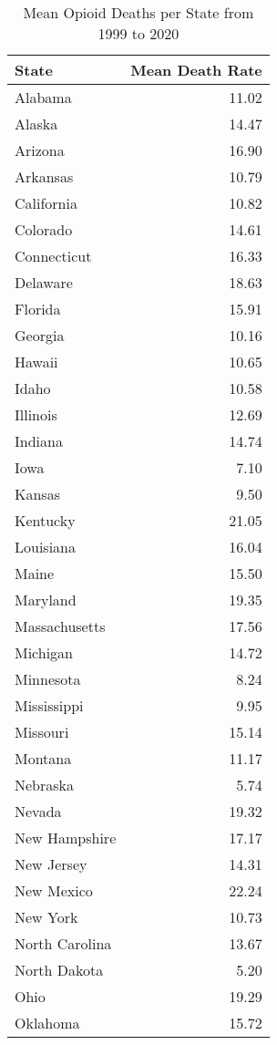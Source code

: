 \begin{table}\centering
\caption{Mean Opioid Deaths per State from 1999 to 2020}
\label{}
\begin{tabular}[t]{l|r}
\hline
State & Mean Death Rate\\
\hline
Alabama & 11.02\\
\hline
Alaska & 14.47\\
\hline
Arizona & 16.90\\
\hline
Arkansas & 10.79\\
\hline
California & 10.82\\
\hline
Colorado & 14.61\\
\hline
Connecticut & 16.33\\
\hline
Delaware & 18.63\\
\hline
Florida & 15.91\\
\hline
Georgia & 10.16\\
\hline
Hawaii & 10.65\\
\hline
Idaho & 10.58\\
\hline
Illinois & 12.69\\
\hline
Indiana & 14.74\\
\hline
Iowa & 7.10\\
\hline
Kansas & 9.50\\
\hline
Kentucky & 21.05\\
\hline
Louisiana & 16.04\\
\hline
Maine & 15.50\\
\hline
Maryland & 19.35\\
\hline
Massachusetts & 17.56\\
\hline
Michigan & 14.72\\
\hline
Minnesota & 8.24\\
\hline
Mississippi & 9.95\\
\hline
Missouri & 15.14\\
\hline
Montana & 11.17\\
\hline
Nebraska & 5.74\\
\hline
Nevada & 19.32\\
\hline
New Hampshire & 17.17\\
\hline
New Jersey & 14.31\\
\hline
New Mexico & 22.24\\
\hline
New York & 10.73\\
\hline
North Carolina & 13.67\\
\hline
North Dakota & 5.20\\
\hline
Ohio & 19.29\\
\hline
Oklahoma & 15.72\\

\end{tabular}
\end{table}
